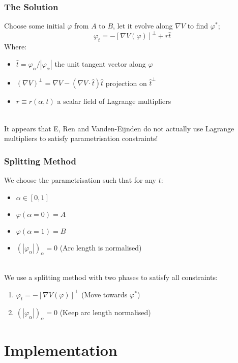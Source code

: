 \documentclass{beamer}
\renewcommand{\phi}{\varphi}
\renewcommand{\(}{\left(}
\renewcommand{\)}{\right)}
\begin{document}
\begin{frame}
\frametitle{The Solution}
Choose some initial $\phi$ from $A$ to $B$, let it evolve along $\nabla V$ to find $\phi^*$;
$$\phi_t=-[\nabla V(\phi)]^\bot+r\hat t$$
Where:
\begin{itemize}
\item $\hat t = {\phi_\alpha}/{|\phi_\alpha|}$\hspace{2em} the unit tangent vector along $\phi$
\item $(\nabla V)^\bot = \nabla V - (\nabla V \cdot \hat t)\hat t$\hspace{2em}  projection on $\hat t^\bot$ 
\item $r \equiv r(\alpha, t)$ \hspace{2em}a scalar field of Lagrange multipliers
\end{itemize}
~\\
It appears that E, Ren and Vanden-Eijnden do not actually use Lagrange multipliers to satisfy parametrisation constraints!%
\end{frame}

\begin{frame}
\frametitle{Splitting Method}
We choose the parametrisation such that for any $t$:
\begin{itemize}
\item $\alpha\in [0,1]$
\item $\phi(\alpha=0)=A$ 
\item $\phi(\alpha=1)=B$
\item $(|\phi_\alpha|)_\alpha = 0$ \hspace{3em} (Arc length is normalised)
\end{itemize}
~\\
We use a splitting method with two phases to satisfy all constraints: 
\begin{enumerate}
\item $\phi_t=-[\nabla V(\phi)]^\bot$ \hspace{3em} (Move towards $\phi^*$)
\item $(|\phi_\alpha|)_\alpha = 0$ \hspace{3em} (Keep arc length normalised)
\end{enumerate}
\end{frame}

\section{Implementation}
\end{document}
